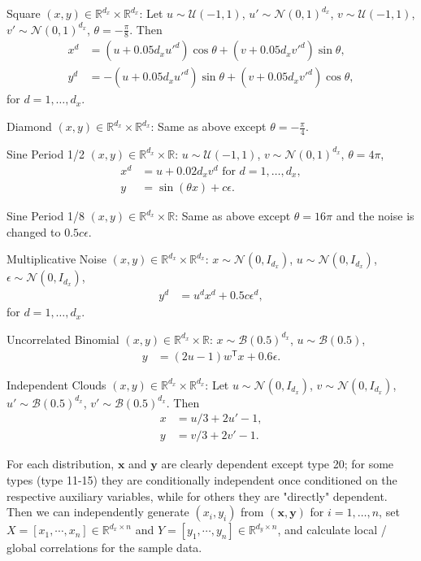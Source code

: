 \documentclass[11pt]{article}
\newcommand{\T}{^{\ensuremath{\mathsf{T}}}}           %
\providecommand{\mb}[1]{\boldsymbol{#1}}
\providecommand{\mc}[1]{\mathcal{#1}}
\newcommand{\Real}{\mathbb{R}}
\begin{document}
\begin{compactenum}
\item Square $(x,y) \in \Real^{d_{x}} \times \Real^{d_{x}}$: Let $u \sim \mc{U}(-1,1)$, $u' \sim \mc{N}(0,1)^{d_{x}}$, $v \sim \mc{U}(-1,1)$, $v' \sim \mc{N}(0,1)^{d_{x}}$, $\theta=-\frac{\pi}{8}$. Then
\begin{align*}
x^{d}&=(u+0.05 d_{x}u'^{d}) \cos\theta + (v+0.05 d_{x}v'^{d}) \sin\theta,\\
y^{d}&=-(u+0.05 d_{x}u'^{d}) \sin\theta + (v+0.05 d_{x}v'^{d}) \cos\theta,
\end{align*}
for $d=1,\ldots,d_{x}$.
\item Diamond $(x,y) \in \Real^{d_{x}} \times \Real^{d_{x}}$: Same as above except $\theta=-\frac{\pi}{4}$.
\item Sine Period 1/2 $(x,y) \in \Real^{d_{x}} \times \Real$: $u \sim \mc{U}(-1,1)$, $v \sim \mc{N}(0,1)^{d_{x}}$, $\theta=4\pi$,
\begin{align*}
x^{d}&=u+0.02 d_{x} v^{d} \mbox{ for $d=1,\ldots,d_{x}$}, \\
y&=\sin ( \theta x )+c\epsilon.
\end{align*}
\item Sine Period 1/8 $(x,y) \in \Real^{d_{x}} \times \Real$: Same as above except $\theta=16\pi$ and the noise is changed to $0.5c\epsilon$.
\item Multiplicative Noise $(x,y) \in \Real^{d_{x}} \times \Real^{d_{x}}$: $x \sim \mc{N}(0, I_{d_{x}})$, $u \sim \mc{N}(0, I_{d_{x}})$, $\epsilon \sim \mc{N}(0, I_{d_{x}})$,
\begin{align*}
y^{d}&=u^{d}x^{d}+0.5c\epsilon^{d},
\end{align*}
for $d=1,\ldots,d_{x}$.
\item Uncorrelated Binomial $(x,y) \in \Real^{d_{x}} \times \Real$: $x \sim \mc{B}(0.5)^{d_{x}}$, $u \sim \mc{B}(0.5)$,
\begin{align*}
y&=(2u-1)w\T x+0.6\epsilon.
\end{align*}
\item Independent Clouds $(x,y) \in \Real^{d_{x}} \times \Real^{d_{x}}$: Let $u \sim \mc{N}(0,I_{d_{x}})$, $v \sim \mc{N}(0,I_{d_{x}})$, $u' \sim \mc{B}(0.5)^{d_{x}}$, $v' \sim \mc{B}(0.5)^{d_{x}}$. Then
\begin{align*}
x&=u/3+2u'-1,\\
y&=v/3+2v'-1.
\end{align*}
\end{compactenum}

For each distribution, $\mb{x}$ and $\mb{y}$ are clearly dependent except type 20; for some types (type 11-15) they are conditionally independent once conditioned on the respective auxiliary variables, while for others they are "directly" dependent. Then we can independently generate $(x_{i},y_{i})$ from $(\mb{x},\mb{y})$ for $i=1,\ldots,n$, set $X=[x_{1},\cdots, x_{n}] \in \Real^{d_{x} \times n}$ and $Y=[y_{1},\cdots, y_{n}] \in \Real^{d_{y} \times n}$, and calculate local / global correlations for the sample data.
\end{document}
